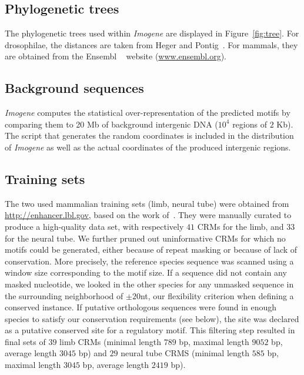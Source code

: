 \documentclass[a4,center,fleqn]{NAR}
\begin{document}
\subsection*{Phylogenetic trees} 

The phylogenetic trees used within {\em Imogene} are displayed in
Figure~\ref{fig:tree}.
For drosophilae, the distances are taken from Heger and
Pontig~\cite{pmid18039870}.
For mammals, they are obtained from the Ensembl  ~\cite{Flicek2012fk}
website
(\url{www.ensembl.org}).


\subsection*{Background sequences}

\textit{Imogene} computes  the statistical over-representation of the predicted
motifs by comparing them to 20 Mb of background intergenic DNA ($10^4$ regions
of $2$ Kb).
The script that generates the  random coordinates is included in the
distribution of {\em Imogene} as well as the actual coordinates of the produced
intergenic regions.

\subsection*{Training sets}
The two used mammalian training sets (limb, neural tube) were obtained from
\url{http://enhancer.lbl.gov}, based on the work
of~\cite{Visel:2009fr,pmid22138689}.
They were manually curated to produce a high-quality data set, with
respectively $41$ CRMs for the limb, and $33$ for the neural tube.
We further pruned out uninformative CRMs for which no motifs could be generated, 
either because of repeat masking or because of lack of conservation.
More precisely, the reference species sequence was scanned using a window size
corresponding to the motif size.
If a sequence did not contain any masked nucleotide, we looked in the other
species for any unmasked sequence in the surrounding neighborhood of $\pm20$nt,
our flexibility criterion when defining a conserved instance.
If putative orthologous sequences were found in enough species to satisfy our
conservation requirements (see below), the site was declared as a putative
conserved site for a regulatory motif. This filtering step resulted in final
sets of  $39$ limb CRMs (minimal length $789$ bp, maximal length $9052$ bp,
average length $3045$ bp) and $29$  neural tube CRMS (minimal length $585$ bp,
maximal length $3045$ bp, average length $2419$ bp).
\end{document}
